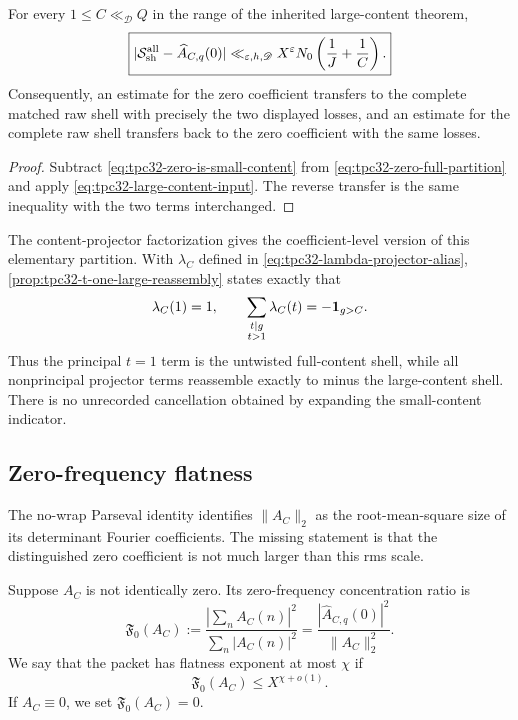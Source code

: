 \begin{proposition}
\label{prop:tpc32-zero-full-equivalence}
For every $1\le C\ll_{\mathscr D}Q$ in the range of the inherited
large-content theorem,
\begin{equation}
 \boxed{
 |\mathcal S_{\rm sh}^{\rm all}-\widehat A_{C,q}(0)|
 \ll_{\varepsilon,h,\mathscr D}
 X^\varepsilon N_0\left(\frac1J+\frac1C\right).}
 \label{eq:tpc32-zero-full-splice-bound}
\end{equation}
Consequently, an estimate for the zero coefficient transfers to the
complete matched raw shell with precisely the two displayed losses, and an
estimate for the complete raw shell transfers back to the zero coefficient
with the same losses.
\end{proposition}

\begin{proof}
Subtract \eqref{eq:tpc32-zero-is-small-content} from
\eqref{eq:tpc32-zero-full-partition} and apply
\eqref{eq:tpc32-large-content-input}.  The reverse transfer is the same
inequality with the two terms interchanged.
\end{proof}

The content-projector factorization gives the coefficient-level version
of this elementary partition.  With \(\lambda_C\) defined in
\eqref{eq:tpc32-lambda-projector-alias},
\cref{prop:tpc32-t-one-large-reassembly} states exactly that
\[
 \lambda_C(1)=1,\qquad
 \sum_{\substack{t\mid g\\t>1}}\lambda_C(t)=-\mathbf 1_{g>C}.
\]
Thus the principal \(t=1\) term is the untwisted full-content shell, while
all nonprincipal projector terms reassemble exactly to minus the
large-content shell.  There is no unrecorded cancellation obtained by
expanding the small-content indicator.

\subsection{Zero-frequency flatness}

The no-wrap Parseval identity identifies
$\|A_C\|_2$ as the root-mean-square size of its determinant Fourier
coefficients.  The missing statement is that the distinguished zero
coefficient is not much larger than this rms scale.

\begin{definition}
\label{def:tpc32-zero-flatness}
Suppose $A_C$ is not identically zero.  Its zero-frequency concentration
ratio is
\begin{equation}
 \mathfrak F_0(A_C)
 :=\frac{|\sum_nA_C(n)|^2}{\sum_n|A_C(n)|^2}
 =\frac{|\widehat A_{C,q}(0)|^2}{\|A_C\|_2^2}.
 \label{eq:tpc32-zero-concentration-ratio}
\end{equation}
We say that the packet has flatness exponent at most $\chi$ if
\begin{equation}
 \boxed{
 \mathfrak F_0(A_C)\le X^{\chi+o(1)}.}
 \label{eq:tpc32-flatness-hypothesis}
\end{equation}
If $A_C\equiv0$, we set $\mathfrak F_0(A_C)=0$.
\end{definition}

